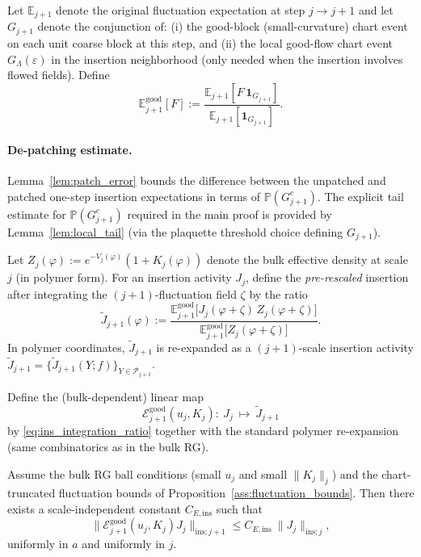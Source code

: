 \begin{definition}\label{def:E_good_ins}
Let $\mathbb E_{j+1}$ denote the original fluctuation expectation at step $j\to j+1$ and let $G_{j+1}$ denote the conjunction of:
(i) the good-block (small-curvature) chart event on each unit coarse block at this step, and
(ii) the local good-flow chart event $G_{\Lambda}(\varepsilon)$ in the insertion neighborhood (only needed when the insertion involves flowed fields).
Define
\[
\mathbb E^{\mathrm{good}}_{j+1}[F]
:=\frac{\mathbb E_{j+1}[F\,\mathbf 1_{G_{j+1}}]}{\mathbb E_{j+1}[\mathbf 1_{G_{j+1}}]}.
\]
\end{definition}

\paragraph{De-patching estimate.}
Lemma~\ref{lem:patch_error} bounds the difference between the unpatched and patched one-step insertion expectations in terms of $\mathbb P(G_{j+1}^c)$.
The explicit tail estimate for $\mathbb P(G_{j+1}^c)$ required in the main proof is provided by Lemma~\ref{lem:local_tail} (via the plaquette threshold choice defining $G_{j+1}$).

Let $Z_j(\varphi):=e^{-V_j(\varphi)}(1+K_j(\varphi))$ denote the bulk effective density at scale $j$ (in polymer form).
For an insertion activity $J_j$, define the \emph{pre-rescaled} insertion after integrating the $(j+1)$-fluctuation field $\zeta$ by the ratio
\begin{equation}\label{eq:ins_integration_ratio}
\widetilde J_{j+1}(\varphi)
:=
\frac{\mathbb E_{j+1}^{\mathrm{good}}\!\big[J_j(\varphi+\zeta)\,Z_j(\varphi+\zeta)\big]}
{\mathbb E_{j+1}^{\mathrm{good}}\!\big[Z_j(\varphi+\zeta)\big]}.
\end{equation}
In polymer coordinates, $\widetilde J_{j+1}$ is re-expanded as a $(j+1)$-scale insertion activity
$\widetilde J_{j+1}=\{\widetilde J_{j+1}(Y;f)\}_{Y\in\mathscr P_{j+1}}$.

\begin{definition}\label{def:E_ins}
Define the (bulk-dependent) linear map
\[
\mathcal E^{\mathrm{good}}_{j+1}(u_j,K_j):\ J_j\ \mapsto\ \widetilde J_{j+1}
\]
by \eqref{eq:ins_integration_ratio} together with the standard polymer re-expansion (same combinatorics as in the bulk RG).
\end{definition}

\begin{lemma}\label{lem:Eins_bound}
Assume the bulk RG ball conditions (small $u_j$ and small $\|K_j\|_j$) and the chart-truncated fluctuation bounds of Proposition~\ref{ass:fluctuation_bounds}.
Then there exists a scale-independent constant $C_{E,\mathrm{ins}}$ such that
\[
\|\mathcal E^{\mathrm{good}}_{j+1}(u_j,K_j)J_j\|_{\mathrm{ins};j+1}
\le C_{E,\mathrm{ins}}\ \|J_j\|_{\mathrm{ins};j},
\]
uniformly in $a$ and uniformly in $j$.
\end{lemma}

